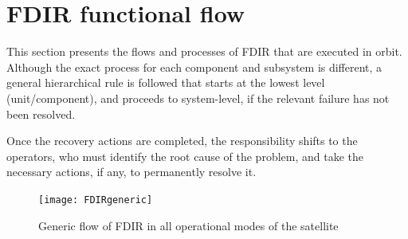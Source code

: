 \documentclass[a4paper,nobib]{tufte-book}
\begin{document}
\clearpage
\section{\acs{FDIR} functional flow}
\label{sec:fdir_operating_modes}

This section presents the flows and processes of \acs{FDIR} that are executed in orbit. Although the exact process for each component and subsystem is different, a general hierarchical rule is followed that starts at the lowest level (unit/component), and proceeds to system-level, if the relevant failure has not been resolved.

Once the recovery actions are completed, the responsibility shifts to the operators, who must identify the root cause of the problem, and take the necessary actions, if any, to permanently resolve it.

\begin{figure}[h]
	\texttt{[image: FDIRgeneric]}
	\caption{Generic flow of \acs{FDIR} in all operational modes of the satellite}
	\label{fig:generalflow}
\end{figure}
\end{document}

